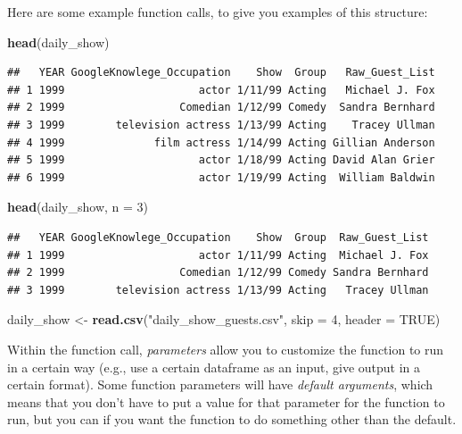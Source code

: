 \documentclass[]{book}
\makeatletter
\newenvironment{Shaded}{\begin{snugshade}}{\end{snugshade}}
\newcommand{\KeywordTok}[1]{\textcolor[rgb]{0.13,0.29,0.53}{\textbf{{#1}}}}
\newcommand{\DataTypeTok}[1]{\textcolor[rgb]{0.13,0.29,0.53}{{#1}}}
\newcommand{\DecValTok}[1]{\textcolor[rgb]{0.00,0.00,0.81}{{#1}}}
\newcommand{\StringTok}[1]{\textcolor[rgb]{0.31,0.60,0.02}{{#1}}}
\newcommand{\OtherTok}[1]{\textcolor[rgb]{0.56,0.35,0.01}{{#1}}}
\newcommand{\NormalTok}[1]{{#1}}
\newenvironment{kframe}{%
\medskip{}
\setlength{\fboxsep}{.8em}
 \def\at@end@of@kframe{}%
 \ifinner\ifhmode%
  \def\at@end@of@kframe{\end{minipage}}%
  \begin{minipage}{\columnwidth}%
 \fi\fi%
 \def\FrameCommand##1{\hskip\@totalleftmargin \hskip-\fboxsep
 \colorbox{shadecolor}{##1}\hskip-\fboxsep
     \hskip-\linewidth \hskip-\@totalleftmargin \hskip\columnwidth}%
 \MakeFramed {\advance\hsize-\width
   \@totalleftmargin\z@ \linewidth\hsize
   \@setminipage}}%
 {\par\unskip\endMakeFramed%
 \at@end@of@kframe}
\renewenvironment{Shaded}{\begin{kframe}}{\end{kframe}}
\makeatother
\begin{document}
Here are some example function calls, to give you examples of this
structure:

\begin{Shaded}
\begin{Highlighting}[]
\KeywordTok{head}\NormalTok{(daily_show)}
\end{Highlighting}
\end{Shaded}

\begin{verbatim}
##   YEAR GoogleKnowlege_Occupation    Show  Group   Raw_Guest_List
## 1 1999                     actor 1/11/99 Acting   Michael J. Fox
## 2 1999                  Comedian 1/12/99 Comedy  Sandra Bernhard
## 3 1999        television actress 1/13/99 Acting    Tracey Ullman
## 4 1999              film actress 1/14/99 Acting Gillian Anderson
## 5 1999                     actor 1/18/99 Acting David Alan Grier
## 6 1999                     actor 1/19/99 Acting  William Baldwin
\end{verbatim}

\begin{Shaded}
\begin{Highlighting}[]
\KeywordTok{head}\NormalTok{(daily_show, }\DataTypeTok{n =} \DecValTok{3}\NormalTok{)}
\end{Highlighting}
\end{Shaded}

\begin{verbatim}
##   YEAR GoogleKnowlege_Occupation    Show  Group  Raw_Guest_List
## 1 1999                     actor 1/11/99 Acting  Michael J. Fox
## 2 1999                  Comedian 1/12/99 Comedy Sandra Bernhard
## 3 1999        television actress 1/13/99 Acting   Tracey Ullman
\end{verbatim}

\begin{Shaded}
\begin{Highlighting}[]
\NormalTok{daily_show <-}\StringTok{ }\KeywordTok{read.csv}\NormalTok{(}\StringTok{"daily_show_guests.csv"}\NormalTok{,}
                    \DataTypeTok{skip =} \DecValTok{4}\NormalTok{,}
                    \DataTypeTok{header =} \OtherTok{TRUE}\NormalTok{)}
\end{Highlighting}
\end{Shaded}

Within the function call, \emph{parameters} allow you to customize the
function to run in a certain way (e.g., use a certain dataframe as an
input, give output in a certain format). Some function parameters will
have \emph{default arguments}, which means that you don't have to put a
value for that parameter for the function to run, but you can if you
want the function to do something other than the default.
\end{document}
